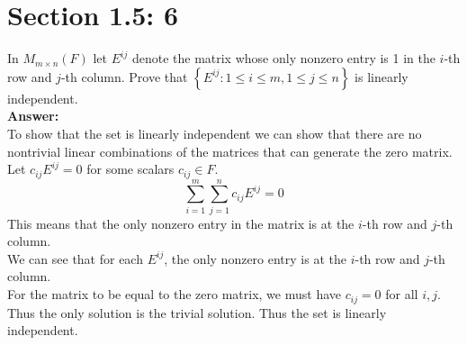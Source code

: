 \documentclass{article}
\begin{document}
\section*{Section 1.5: 6}
In $M_{m \times n}(F) $ let $E^{ij}$ denote the matrix whose only nonzero entry is 1 in the $i$-th row and $j$-th column. Prove that $\left\{E^{ij}: 1 \leq i \leq m, 1 \leq j \leq n \right\}$ is linearly independent.\\
\textbf{Answer:} \\
To show that the set is linearly independent we can show that there are no nontrivial linear combinations of the matrices that can generate the zero matrix.\\
Let $c_{ij}E^{ij} = 0$ for some scalars $c_{ij} \in F$.\\
$$ \sum_{i=1}^{m} \sum_{j=1}^{n} c_{ij}E^{ij} = 0$$
This means that the only nonzero entry in the matrix is at the $i$-th row and $j$-th column.\\
We can see that for each $E^{ij}$, the only nonzero entry is at the $i$-th row and $j$-th column.\\
For the matrix to be equal to the zero matrix, we must have $c_{ij} = 0$ for all $i,j$.\\
Thus the only solution is the trivial solution. Thus the set is linearly independent.\\
\end{document}
